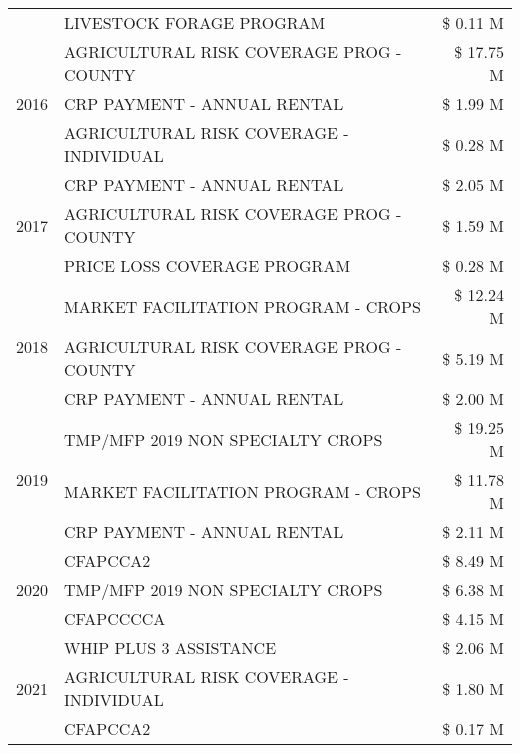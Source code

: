 \begin{tabular}{llr}
 & LIVESTOCK FORAGE PROGRAM & \$ 0.11 M \\
\cline{1-3}
\multirow[t]{3}{*}{2016} & AGRICULTURAL RISK COVERAGE PROG - COUNTY & \$ 17.75 M \\
 & CRP PAYMENT - ANNUAL RENTAL & \$ 1.99 M \\
 & AGRICULTURAL RISK COVERAGE - INDIVIDUAL & \$ 0.28 M \\
\cline{1-3}
\multirow[t]{3}{*}{2017} & CRP PAYMENT - ANNUAL RENTAL & \$ 2.05 M \\
 & AGRICULTURAL RISK COVERAGE PROG - COUNTY & \$ 1.59 M \\
 & PRICE LOSS COVERAGE PROGRAM & \$ 0.28 M \\
\cline{1-3}
\multirow[t]{3}{*}{2018} & MARKET FACILITATION PROGRAM - CROPS & \$ 12.24 M \\
 & AGRICULTURAL RISK COVERAGE PROG - COUNTY & \$ 5.19 M \\
 & CRP PAYMENT - ANNUAL RENTAL & \$ 2.00 M \\
\cline{1-3}
\multirow[t]{3}{*}{2019} & TMP/MFP 2019 NON SPECIALTY CROPS & \$ 19.25 M \\
 & MARKET FACILITATION PROGRAM - CROPS & \$ 11.78 M \\
 & CRP PAYMENT - ANNUAL RENTAL & \$ 2.11 M \\
\cline{1-3}
\multirow[t]{3}{*}{2020} & CFAPCCA2 & \$ 8.49 M \\
 & TMP/MFP 2019 NON SPECIALTY CROPS & \$ 6.38 M \\
 & CFAPCCCCA & \$ 4.15 M \\
\cline{1-3}
\multirow[t]{3}{*}{2021} & WHIP PLUS 3 ASSISTANCE & \$ 2.06 M \\
 & AGRICULTURAL RISK COVERAGE - INDIVIDUAL & \$ 1.80 M \\
 & CFAPCCA2 & \$ 0.17 M \\
\cline{1-3}
\bottomrule
\end{tabular}

